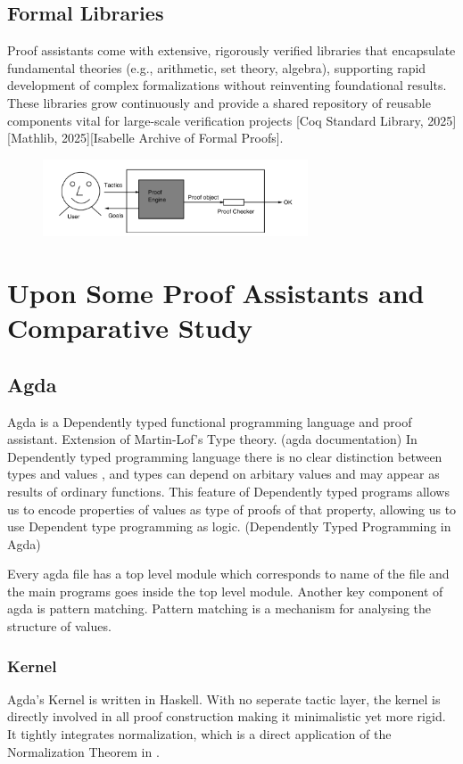 \documentclass[12pt]{article}
\begin{document}
\subsection{Formal Libraries}
Proof assistants come with extensive, rigorously verified libraries that
encapsulate fundamental theories (e.g., arithmetic, set theory, algebra), supporting rapid development of
complex formalizations without reinventing foundational results.
These libraries grow continuously and provide a shared repository of reusable components vital for large-scale verification projects [Coq Standard Library, 2025][Mathlib, 2025][Isabelle Archive of Formal Proofs].


\begin{figure}[h!]
  \centering
  \includegraphics[width=0.7\textwidth]{fig/ui.png} 
  
\end{figure}
\cite{Geuvers20091}

\section{Upon Some Proof Assistants and Comparative Study}
\subsection{ Agda}
Agda  is a Dependently typed functional programming language and proof assistant. Extension of Martin-Lof's Type theory. (agda documentation) 
In Dependently typed programming language there is no clear distinction between types and values , and types can depend on arbitary values and may appear as results of ordinary functions. 
This feature of Dependently typed programs allows us to encode properties of values as type of proofs of that property, allowing us to use Dependent type programming as logic.  (Dependently Typed Programming in Agda) 

Every agda file has a top level module which corresponds to name of the file and the main programs goes inside the top level module.
Another key component of agda is pattern matching. Pattern matching is a mechanism for analysing the structure of values. 


\subsubsection {Kernel}
Agda's Kernel is written in Haskell. With no seperate tactic layer, the kernel is directly involved in all proof construction making it minimalistic yet more rigid. It tightly integrates normalization, which is a direct application of the Normalization Theorem in \cite{martinlof1972intuitionistic_theory}.
\end{document}
